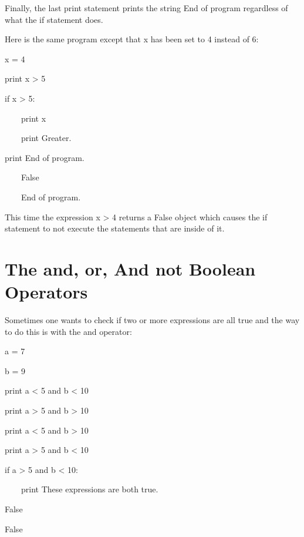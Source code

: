 \documentclass[12pt,twoside]{book}
\begin{document}
\bigskip

Finally, the last print statement prints the string {\textquotedbl}End
of program{\textquotedbl} regardless of what the if statement does.


\bigskip

Here is the same program except that x has been set to 4 instead of 6:


\bigskip

x = 4


\bigskip

print x {\textgreater} 5


\bigskip

if x {\textgreater} 5:

\ \ \ \ print x

\ \ \ \ print {\textquotedbl}Greater.{\textquotedbl}


\bigskip

print {\textquotedbl}End of program.{\textquotedbl}

{\textbar}

\ \ \ \ False

\ \ \ \ End of program.

This time the expression x {\textgreater} 4 returns a False object which
causes the if statement to not execute the statements that are inside
of it.

\section[The and, or, And not Boolean Operators]{The
and, or, And not Boolean Operators}
Sometimes one wants to check if two or more expressions are all true and
the way to do this is with the and operator:


\bigskip

a = 7

b = 9

print a {\textless} 5 and b {\textless} 10

print a {\textgreater} 5 and b {\textgreater} 10

print a {\textless} 5 and b {\textgreater} 10

print a {\textgreater} 5 and b {\textless} 10

if a {\textgreater} 5 and b {\textless} 10:

\ \ \ \ print {\textquotedbl}These expressions are both
true.{\textquotedbl}

{\textbar}

False

False
\end{document}
